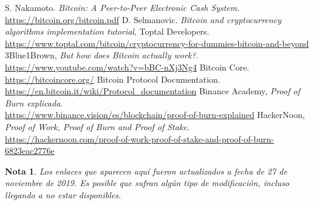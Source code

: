 \documentclass[10pt, a4paper]{article}
\theoremstyle{theorem-style}
\theoremstyle{theorem-style}
\theoremstyle{definition-style}
\theoremstyle{remark-style}
\newtheorem*{nota}{Nota}
\theoremstyle{example-style}
\theoremstyle{definition-style}
\theoremstyle{remark-style}
\begin{document}
\begingroup
\renewcommand{\section}[5]{}%

\begin{thebibliography}{11}
	S. Nakamoto. \emph{Bitcoin: A Peer-to-Peer Electronic Cash System}.
	\\\url{https://bitcoin.org/bitcoin.pdf}
	D. Selmanovic. \emph{Bitcoin and cryptocurrency algorithms implementation tutorial}, Toptal Developers.
	\\\url{https://www.toptal.com/bitcoin/cryptocurrency-for-dummies-bitcoin-and-beyond}
	3Blue1Brown, \emph{But how does Bitcoin actually work?}.\\\url{https://www.youtube.com/watch?v=bBC-nXj3Ng4}
	Bitcoin Core.\\\url{https://bitcoincore.org/}
	Bitcoin Protocol Documentation.\\\url{https://en.bitcoin.it/wiki/Protocol_documentation}
	Binance Academy, \emph{Proof of Burn explicada}.
	\\\url{https://www.binance.vision/es/blockchain/proof-of-burn-explained}
	HackerNoon, \emph{Proof of Work, Proof of Burn and Proof of Stake}.\\\url{https://hackernoon.com/proof-of-work-proof-of-stake-and-proof-of-burn-6823eac2776e}
\end{thebibliography}
\endgroup

\vspace{9cm}
\begin{nota}
	Los enlaces que aparecen aquí fueron actualizados a fecha de 27 de noviembre de 2019. Es posible que sufran algún tipo de modificación, incluso llegando a no estar disponibles.
	
\end{nota}
\end{document}
